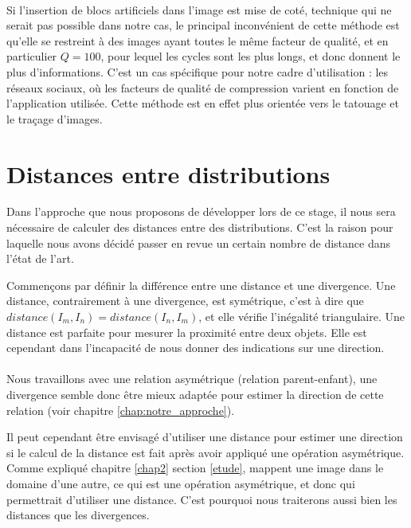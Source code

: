 \documentclass[utf8,final]{stageM2R} %
\begin{document}
\paragraph{}

Si l'insertion de blocs artificiels dans l'image est mise de coté, technique qui ne serait pas possible dans notre cas, le principal inconvénient de cette méthode 
 est qu'elle se restreint à des images ayant toutes le même facteur de qualité, et en particulier $Q = 100$, pour lequel les cycles sont les plus longs, et donc donnent le plus d'informations. C'est un cas spécifique pour notre cadre d'utilisation : les réseaux sociaux, où les facteurs de qualité de compression varient en fonction de l'application utilisée. Cette méthode est en effet plus orientée vers le tatouage et le traçage d'images.

\section{Distances entre distributions}

Dans l'approche que nous proposons de développer lors de ce stage, il nous sera nécessaire de calculer des distances entre des distributions. C'est la raison pour laquelle nous avons décidé passer en revue un certain nombre de distance dans l'état de l'art.

Commençons par définir la différence entre une distance et une divergence. Une distance, contrairement à une divergence, est symétrique, c'est à dire que $distance(I_{m},I_{n}) = distance(I_{n},I_{m})$, et elle vérifie l'inégalité triangulaire. Une distance est parfaite pour mesurer la proximité entre deux objets. Elle est cependant dans l'incapacité de nous donner des indications sur une direction.

\paragraph{}

Nous travaillons avec une relation asymétrique (relation parent-enfant), une divergence semble donc être mieux adaptée pour estimer la direction de cette relation (voir chapitre \ref{chap:notre_approche}).

Il peut cependant être envisagé d'utiliser une distance pour estimer une direction si le calcul de la distance est fait après avoir appliqué une opération asymétrique. Comme expliqué chapitre \ref{chap2} section \ref{etude},  mappent une image dans le domaine d'une autre, ce qui est une opération asymétrique, et donc qui permettrait d'utiliser une distance. C'est pourquoi nous traiterons aussi bien les distances que les divergences.
\end{document}
